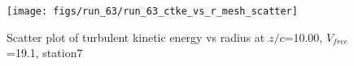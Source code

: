 \begin{figure}[H]
\centering
\texttt{[image: figs/run\_63/run\_63\_ctke\_vs\_r\_mesh\_scatter]}
\caption{Scatter plot of turbulent kinetic energy vs radius at $z/c$=10.00, $V_{free}$=19.1, station7}
\label{fig:run_63_ctke_vs_r_mesh_scatter}
\end{figure}


